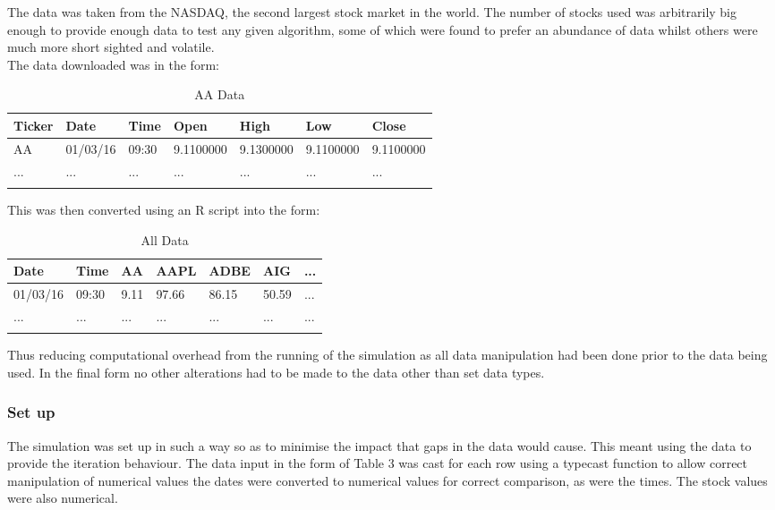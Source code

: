 \documentclass[12pt,a4paper]{article}
\begin{document}
The data was taken from the NASDAQ, the second largest stock market in the world. The number of stocks used was arbitrarily big enough to provide enough data to test any given algorithm, some of which were found to prefer an abundance of data whilst others were much more short sighted and volatile. \\

The data downloaded was in the form:

\label{units}
\begin{longtable}{ |p{1.5cm}|p{1.5cm}|p{1.5cm}|p{2cm}|p{2cm}|p{2cm}|p{2cm}| }\hline\hline
Ticker & Date & Time & Open & High & Low & Close \\ \hline
AA & 01/03/16 & 09:30 & 9.1100000 & 9.1300000 & 9.1100000 & 9.1100000 \\ \hline
... & ... & ... & ... & ... & ... & ... \\ \hline
\caption{AA Data}
\end{longtable}

This was then converted using an R script into the form:

\label{units}
\begin{longtable}{ |p{1.5cm}|p{1.5cm}|p{2cm}|p{2cm}|p{2cm}|p{2cm}|p{1.5cm}| }\hline\hline
Date & Time & AA & AAPL & ADBE & AIG & ... \\ \hline
01/03/16 & 09:30 & 9.11 & 97.66 & 86.15 & 50.59 & ... \\ \hline
... & ... & ... & ... & ... & ... & ... \\ \hline
\caption{All Data}
\end{longtable}

Thus reducing computational overhead from the running of the simulation as all data manipulation had been done prior to the data being used. In the final form no other alterations had to be made to the data other than set data types. 

\subsubsection*{Set up}

The simulation was set up in such a way so as to minimise the impact that gaps in the data would cause. This meant using the data to provide the iteration behaviour. The data input in the form of Table 3 was cast for each row using a typecast function to allow correct manipulation of numerical values the dates were converted to numerical values for correct comparison, as were the times. The stock values were also numerical. \\
\end{document}
